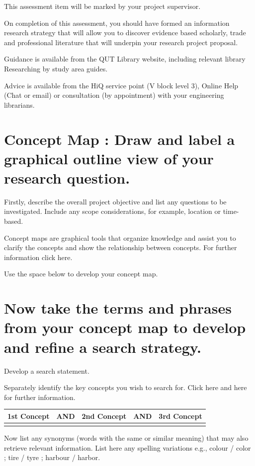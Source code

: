 \documentclass[12pt, a4paper]{article}
\begin{document}
This assessment item will be marked by your project supervisor.

On completion of this assessment, you should have formed an information research strategy that will allow you to discover evidence based scholarly, trade and professional literature that will underpin your research project proposal.

Guidance is available from the QUT Library website, including relevant library Researching by study area guides.

Advice is available from the HiQ service point (V block level 3), Online Help (Chat or email) or consultation (by appointment) with your engineering librarians.

\section*{Concept Map : Draw and label a graphical outline view of your research question.}
Firstly, describe the overall project objective and list any questions to be investigated. Include any scope considerations, for example, location or time-based.

Concept maps are graphical tools that organize knowledge and assist you to clarify the concepts and show the relationship between concepts. For further information click here.

Use the space below to develop your concept map.
\vspace{3cm}

\section*{Now take the terms and phrases from your concept map to develop and refine a search strategy.}
Develop a search statement.

Separately identify the key concepts you wish to search for. Click here and here for further information.

\begin{table}[h]
\centering
\renewcommand{\arraystretch}{1.5}
\begin{tabular}{|p{3.5cm}|c|p{3.5cm}|c|p{3.5cm}|}
\hline
\centering 1st Concept & AND & \centering 2nd Concept & AND & \centering\arraybackslash 3rd Concept \\
\hline
 & & & & \\[1.5cm]
\hline
\end{tabular}
\end{table}

Now list any synonyms (words with the same or similar meaning) that may also retrieve relevant information. List here any spelling variations e.g., colour / color ; tire / tyre ; harbour / harbor.
\end{document}
